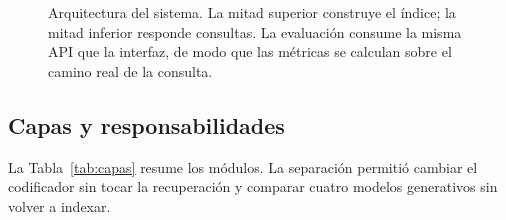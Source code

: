 \documentclass[11pt]{tg_usta}
\begin{document}
\begin{figure}[htbp]
\caption{Arquitectura del sistema. La mitad superior construye el índice; la mitad inferior responde consultas. La evaluación consume la misma API que la interfaz, de modo que las métricas se calculan sobre el camino real de la consulta.}
\label{fig:arquitectura}
\end{figure}

\subsection{Capas y responsabilidades}

La Tabla~\ref{tab:capas} resume los módulos. La separación permitió cambiar el codificador sin tocar la recuperación y comparar cuatro modelos generativos sin volver a indexar.
\end{document}
